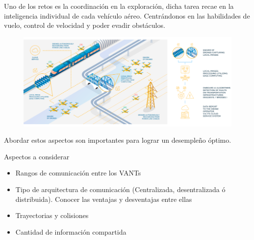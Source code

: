 \documentclass[
	11pt, %
]{beamer}
\begin{document}
\begin{frame}
  Uno de los retos es la coordinación en la exploración, dicha tarea recae en la inteligencia individual de cada vehículo aéreo. Centrándonos en las habilidades de vuelo, control de velocidad y poder evadir obstáculos.

  \begin{figure}
    \includegraphics[width=0.9\linewidth]{drones_action}
  \end{figure}
  
  Abordar estos aspectos son importantes para lograr un desempleño óptimo.
  
\end{frame}

\begin{frame}

  Aspectos a considerar

  \begin{itemize}
  \item Rangos de comunicación entre los VANTs
  \item Tipo de arquitectura de comunicación (Centralizada, desentralizada ó distribuida). Conocer las ventajas y desventajas entre ellas
  \item Trayectorias y colisiones
  \item Cantidad de información compartida
  \end{itemize}
  
\end{frame}
\end{document}
